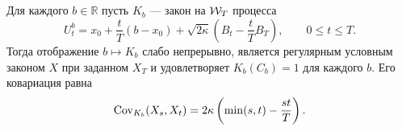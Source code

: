 \subsection{}
\begin{proposition}
\label{prop:bridge-kernel}
{Для каждого $b\in\mathbb R$ пусть $K_b$ --- закон на $\mathcal W_T$ процесса}
\begin{equation}\label{eq:bridge-kernel}
U_t^b=x_0+\frac{t}{T}(b-x_0)
+\sqrt{2\kappa}\left(B_t-\frac{t}{T}B_T\right),\qquad 0\le t\le T.
\end{equation}
{Тогда отображение $b\mapsto K_b$ слабо непрерывно, является регулярным условным законом $X$ при заданном $X_T$ и удовлетворяет $K_b(C_b)=1$ для каждого $b$. Его ковариация равна}
\begin{equation}\label{eq:bridge-cov}
\operatorname{Cov}_{K_b}(X_s,X_t)=2\kappa\left(\min(s,t)-\frac{st}{T}\right).
\end{equation}
\end{proposition}
